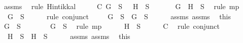 \begin{isabellebody}
\ assms{\isacharparenleft}{}{\isacharparenright}\ \isamarkupfalse%
\ {\isacharparenleft}rule\ Hintikka{\isacharunderscore}l{}{\isacharparenright}\isanewline
\ \ \isamarkupfalse%
\ \isamarkupfalse%
\ C{\isacharcolon}{\isachardoublequoteopen}\isactrlbold {\isasymnot}\ G\ {\isasymin}\ S\ {\isasymand}\ \isactrlbold {\isasymnot}\ H\ {\isasymin}\ S{\isachardoublequoteclose}\isanewline
\ \ \ \ \isamarkupfalse%
\ {\isacartoucheopen}\isactrlbold {\isasymnot}\ {\isacharparenleft}G\ \isactrlbold {\isasymor}\ H{\isacharparenright}\ {\isasymin}\ S{\isacartoucheclose}\ \isamarkupfalse%
\ {\isacharparenleft}rule\ mp{\isacharparenright}\isanewline
\ \ \isamarkupfalse%
\ \isamarkupfalse%
\ {\isachardoublequoteopen}\isactrlbold {\isasymnot}\ G\ {\isasymin}\ S{\isachardoublequoteclose}\isanewline
\ \ \ \ \isamarkupfalse%
\ {\isacharparenleft}rule\ conjunct{}{\isacharparenright}\isanewline
\ \ \isamarkupfalse%
\ {\isachardoublequoteopen}\isactrlbold {\isasymnot}\ G\ {\isasymin}\ S\ {\isasymlongrightarrow}\ G\ {\isasymnotin}\ S{\isachardoublequoteclose}\isanewline
\ \ \ \ \isamarkupfalse%
\ assms{\isacharparenleft}{}{\isacharparenright}\ assms{\isacharparenleft}{}{\isacharparenright}\ \isamarkupfalse%
\ this\isanewline
\ \ \isamarkupfalse%
\ \isamarkupfalse%
\ {\isachardoublequoteopen}G\ {\isasymnotin}\ S{\isachardoublequoteclose}\ \isanewline
\ \ \ \ \isamarkupfalse%
\ {\isacartoucheopen}\isactrlbold {\isasymnot}\ G\ {\isasymin}\ S{\isacartoucheclose}\ \isamarkupfalse%
\ {\isacharparenleft}rule\ mp{\isacharparenright}\ \isanewline
\ \ \isamarkupfalse%
\ {\isachardoublequoteopen}\isactrlbold {\isasymnot}\ H\ {\isasymin}\ S{\isachardoublequoteclose}\isanewline
\ \ \ \ \isamarkupfalse%
\ C\ \isamarkupfalse%
\ {\isacharparenleft}rule\ conjunct{}{\isacharparenright}\isanewline
\ \ \isamarkupfalse%
\ {\isachardoublequoteopen}\isactrlbold {\isasymnot}\ H\ {\isasymin}\ S\ {\isasymlongrightarrow}\ H\ {\isasymnotin}\ S{\isachardoublequoteclose}\isanewline
\ \ \ \ \isamarkupfalse%
\ assms{\isacharparenleft}{}{\isacharparenright}\ assms{\isacharparenleft}{}{\isacharparenright}\ \isamarkupfalse%
\ this\isanewline
\ \ \isamarkupfalse%

\end{isabellebody}
